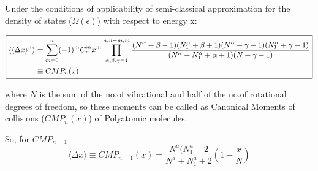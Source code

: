\documentclass{article}
\begin{document}
Under the conditions of applicability of semi-classical approximation for the density of states ($\Omega(\epsilon)$) with respect to energy x:

\begin{equation}
\fbox{\small
$\displaystyle
\begin{aligned}
\langle\langle \Delta x \rangle^n \rangle &= \sum_{m=0}^n (-1)^m C^m_n x^m \prod_{\alpha,\beta,\gamma=1}^{n,n-m,m} \frac{(N^\alpha+\beta-1)(N_1^\alpha+\beta+1)(N^\alpha+\gamma-1)(N_1^\alpha+\gamma-1)}{(N^\alpha+N_1^\alpha+\alpha+1)(N+\gamma-1)} \\
&\equiv CMP_n(x)
\end{aligned}
$}
\label{12}
\end{equation}


where $N$ is the sum of the no.of vibrational and half of the no.of rotational degrees of freedom, so these moments can be called as Canonical Moments of collisions ($CMP_n(x)$) of Polyatomic molecules.

So, for $CMP_{n=1}$
\begin{equation}
    \langle \Delta x \rangle\equiv CMP_{n=1}(x)=\frac{N^a(N^a_{1}+2}{N^a+N^a_{1}+2} (1-\frac{x}{N})
    \label{10}
\end{equation}
\end{document}
